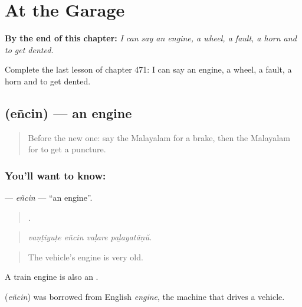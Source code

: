 
\chapter{At the Garage}
\label{ch:ml-at-the-garage}

\begin{chapteropening}
\textbf{By the end of this chapter:} \emph{I can say an engine, a wheel, a fault, a horn and to get dented.}

Complete the last lesson of chapter 471: I can say an engine, a wheel, a fault, a horn and to get dented.
\end{chapteropening}

\section[\texorpdfstring{\ml{എഞ്ചിൻ} (eñcin)}{എഞ്ചിൻ (eñcin)}]{ (eñcin) — an engine}

\label{lesson:ML-C471-encin}



\begin{quote}
Before the new one: say the Malayalam for a brake, then the Malayalam for to get a puncture.
\end{quote}

\subsection*{You'll want to know: }
\textbf{} — \emph{eñcin} — \textquotedblleft{}an engine\textquotedblright{}.

\begin{quote}
   .
\end{quote}

\begin{quote}
\emph{vaṇṭiyuṭe eñcin vaḷare paḻayatāṇŭ.}
\end{quote}

\begin{quote}
The vehicle's engine is very old.
\end{quote}

A train engine is also an .

\begin{cousinweb}
\textbf{} (\emph{eñcin}) was borrowed from English \emph{engine}, the machine that drives a vehicle.
\end{cousinweb}

